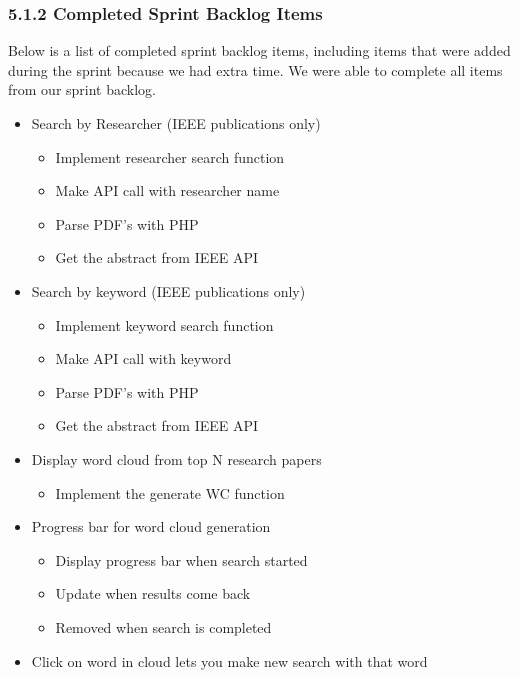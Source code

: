\documentclass[]{article}
\begin{document}
\subsubsection{5.1.2 Completed Sprint Backlog
Items}\label{completed-sprint-backlog-items}

Below is a list of completed sprint backlog items, including items that
were added during the sprint because we had extra time. We were able to
complete all items from our sprint backlog.

\begin{itemize}
\itemsep1pt\parskip0pt
\item
  Search by Researcher (IEEE publications only)

  \begin{itemize}
  \itemsep1pt\parskip0pt
  \item
    Implement researcher search function
  \item
    Make API call with researcher name
  \item
    Parse PDF's with PHP
  \item
    Get the abstract from IEEE API
  \end{itemize}
\item
  Search by keyword (IEEE publications only)

  \begin{itemize}
  \itemsep1pt\parskip0pt
  \item
    Implement keyword search function
  \item
    Make API call with keyword
  \item
    Parse PDF's with PHP
  \item
    Get the abstract from IEEE API
  \end{itemize}
\item
  Display word cloud from top N research papers

  \begin{itemize}
  \itemsep1pt\parskip0pt
  \item
    Implement the generate WC function
  \end{itemize}
\item
  Progress bar for word cloud generation

  \begin{itemize}
  \itemsep1pt\parskip0pt
  \item
    Display progress bar when search started
  \item
    Update when results come back
  \item
    Removed when search is completed
  \end{itemize}
\item
  Click on word in cloud lets you make new search with that word


\end{itemize}
\end{document}
